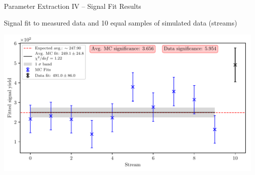 \documentclass[serif]{beamer}
\begin{document}

\begin{frame}[t]{Parameter Extraction IV -- Signal Fit Results}
\vspace{-3mm}
\small

Signal fit to measured data and 10 equal samples of simulated data (streams)
\vspace{-2mm}
\begin{center}
	\includegraphics[width=\textwidth]{fig/sig_global}
\end{center}


\end{frame}

\end{document}
